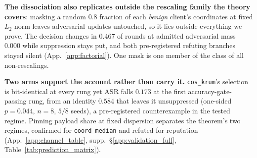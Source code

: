 \documentclass{article}
\begin{document}
\noindent \textbf{The dissociation also replicates outside the rescaling family the theory covers}: masking a random $0.8$ fraction of each \emph{benign} client's coordinates at fixed $L_2$ norm leaves adversarial updates untouched, so it lies outside everything we prove. The decision changes in $0.467$ of rounds at admitted adversarial mass $0.000$ while suppression stays put, and both pre-registered refuting branches stayed silent (App.~\ref{app:factorial}). One mask is one member of the class of all non-rescalings.

\noindent \textbf{Two arms support the account rather than carry it.} \texttt{cos\_krum}'s selection is bit-identical at every rung yet ASR falls $0.173$ at the first accuracy-gate-passing rung, from an identity $0.584$ that leaves it unsuppressed (one-sided $p{=}0.044$, $n{=}8$, $5/8$ seeds), a pre-registered counterexample in the tested regime. Pinning payload share at fixed dispersion separates the theorem's two regimes, confirmed for \texttt{coord\_median} and refuted for reputation (App.~\ref{app:channel_table}, supp.\ §\ref{app:validation_full}, Table~\ref{tab:prediction_matrix}).
\end{document}
